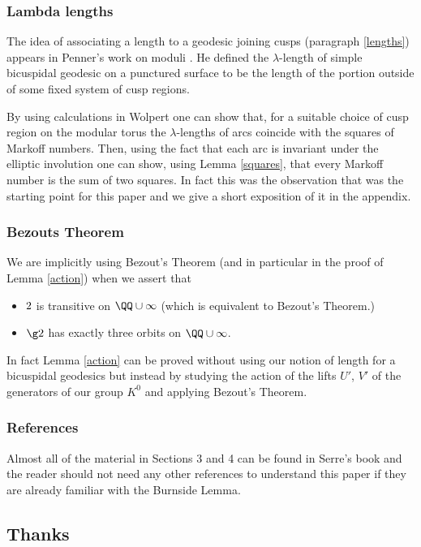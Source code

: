   \subsubsection{Lambda lengths}
 The idea of associating a length to a geodesic joining cusps
 (paragraph \ref{lengths}) appears in Penner's work on moduli \cite{bob}.
He defined the $\lambda$-length of simple bicuspidal geodesic 
on a punctured
surface to be the length of the portion outside of some fixed
 system of cusp regions.
 
 By using calculations in Wolpert \cite{saw}
 one can show that, for a suitable choice of cusp region 
 on the modular torus  the $\lambda$-lengths of arcs 
 coincide with the squares of Markoff numbers. 
 Then, using the fact that each arc is invariant under the 
 elliptic involution one can show, 
using Lemma \ref{squares},
 that every Markoff number is the sum of two squares.
 In fact this was the observation that was the starting point for this paper
 and we give a short exposition of it  in the appendix.
 
 
 \subsubsection{Bezouts Theorem}
 We are implicitly using  Bezout's Theorem
 (and in particular in the proof of Lemma \ref{action})
 when we assert that
 \begin{itemize}
 \item $\sl2$ is transitive on $\QQ \cup \infty$ (which is equivalent to Bezout's Theorem.)
 \item $\g2$ has exactly three orbits on $\QQ \cup \infty$.
 \end{itemize}
In fact Lemma \ref{action} can be proved
 without using our notion of length for a bicuspidal geodesics 
 but  instead by studying the action of 
 the lifts $U'$, $V'$  of the generators of our group $K^0$  
 and applying Bezout's Theorem.
 
 
 \subsubsection{References}
Almost all  of the material in Sections 3 and 4 
can be found in Serre's book \cite{serre} and the reader
should not need any other references to understand 
this paper if they are already familiar with  the Burnside Lemma.
 

\subsection{Thanks}

